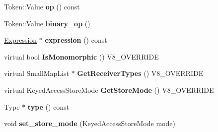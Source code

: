 \begin{DoxyCompactItemize}
\item 
\hypertarget{classv8_1_1internal_1_1_v8___f_i_n_a_l_a7888b5a094e42a12307cd150fdbe678f}{}Token\+::\+Value {\bfseries op} () const \label{classv8_1_1internal_1_1_v8___f_i_n_a_l_a7888b5a094e42a12307cd150fdbe678f}

\item 
\hypertarget{classv8_1_1internal_1_1_v8___f_i_n_a_l_aed3621d823f54c5e996cc78b985875aa}{}Token\+::\+Value {\bfseries binary\+\_\+op} ()\label{classv8_1_1internal_1_1_v8___f_i_n_a_l_aed3621d823f54c5e996cc78b985875aa}

\item 
\hypertarget{classv8_1_1internal_1_1_v8___f_i_n_a_l_adc5b6319eb3831282cfa4861dc34dc4e}{}\hyperlink{classv8_1_1internal_1_1_expression}{Expression} $\ast$ {\bfseries expression} () const \label{classv8_1_1internal_1_1_v8___f_i_n_a_l_adc5b6319eb3831282cfa4861dc34dc4e}

\item 
\hypertarget{classv8_1_1internal_1_1_v8___f_i_n_a_l_ab3b27577f5e222d5cf5e659ec2135e23}{}virtual bool {\bfseries Is\+Monomorphic} () V8\+\_\+\+O\+V\+E\+R\+R\+I\+D\+E\label{classv8_1_1internal_1_1_v8___f_i_n_a_l_ab3b27577f5e222d5cf5e659ec2135e23}

\item 
\hypertarget{classv8_1_1internal_1_1_v8___f_i_n_a_l_add3b27d1df1c5e153be402bd03ccffdb}{}virtual Small\+Map\+List $\ast$ {\bfseries Get\+Receiver\+Types} () V8\+\_\+\+O\+V\+E\+R\+R\+I\+D\+E\label{classv8_1_1internal_1_1_v8___f_i_n_a_l_add3b27d1df1c5e153be402bd03ccffdb}

\item 
\hypertarget{classv8_1_1internal_1_1_v8___f_i_n_a_l_af32afe1cd92df5e1926837238564755d}{}virtual Keyed\+Access\+Store\+Mode {\bfseries Get\+Store\+Mode} () V8\+\_\+\+O\+V\+E\+R\+R\+I\+D\+E\label{classv8_1_1internal_1_1_v8___f_i_n_a_l_af32afe1cd92df5e1926837238564755d}

\item 
\hypertarget{classv8_1_1internal_1_1_v8___f_i_n_a_l_ac1b0f35edb6868656db5154078e75b79}{}Type $\ast$ {\bfseries type} () const \label{classv8_1_1internal_1_1_v8___f_i_n_a_l_ac1b0f35edb6868656db5154078e75b79}

\item 
\hypertarget{classv8_1_1internal_1_1_v8___f_i_n_a_l_ae9fcde66d4e35a5d2dab7a657d44bcf3}{}void {\bfseries set\+\_\+store\+\_\+mode} (Keyed\+Access\+Store\+Mode mode)\label{classv8_1_1internal_1_1_v8___f_i_n_a_l_ae9fcde66d4e35a5d2dab7a657d44bcf3}


\end{DoxyCompactItemize}
